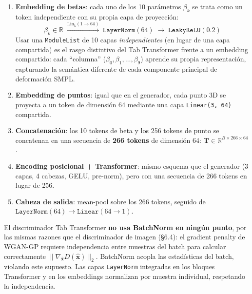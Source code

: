 \documentclass[a4paper,11pt]{article}
\begin{document}
\begin{enumerate}
    \item \textbf{Embedding de betas}: cada uno de los 10 parámetros
          $\beta_k$ se trata como un token independiente con su propia
          capa de proyección:
          \[
            \beta_k \in \mathbb{R}
            \;\xrightarrow{\text{Lin}_k(1 \to 64)}\;
            \texttt{LayerNorm}(64)
            \;\to\; \texttt{LeakyReLU}(0.2)
          \]
          Usar una \texttt{ModuleList} de 10 capas \emph{independientes}
          (en lugar de una capa compartida) es el rasgo distintivo del
          Tab Transformer frente a un embedding compartido: cada ``columna''
          ($\beta_0, \beta_1, \ldots, \beta_9$) aprende su propia
          representación, capturando la semántica diferente de cada
          componente principal de deformación SMPL.

    \item \textbf{Embedding de puntos}: igual que en el generador,
          cada punto 3D se proyecta a un token de dimensión 64 mediante
          una capa \texttt{Linear(3, 64)} compartida.

    \item \textbf{Concatenación}: los 10 tokens de beta y los 256 tokens
          de punto se concatenan en una secuencia de \textbf{266 tokens}
          de dimensión 64:
          $\bm{T} \in \mathbb{R}^{B \times 266 \times 64}$.

    \item \textbf{Encoding posicional + Transformer}: mismo esquema que el
          generador (3 capas, 4 cabezas, GELU, pre-norm), pero con una
          secuencia de 266 tokens en lugar de 256.

    \item \textbf{Cabeza de salida}: mean-pool sobre los 266 tokens,
          seguido de $\texttt{LayerNorm}(64) \to \texttt{Linear}(64 \to 1)$.
\end{enumerate}

\begin{tcolorbox}[colback=orange!5!white, colframe=orange!60!black,
                  title=Nota técnica: ausencia de BatchNorm]
El discriminador Tab Transformer \textbf{no usa BatchNorm en ningún punto},
por las mismas razones que el discriminador de imagen (§6.4): el gradient
penalty de WGAN-GP requiere independencia entre muestras del batch para
calcular correctamente $\|\nabla_{\hat{\bm{x}}} D(\hat{\bm{x}})\|_2$.
BatchNorm acopla las estadísticas del batch, violando este supuesto. Las
capas \texttt{LayerNorm} integradas en los bloques Transformer y en los
embeddings normalizan por muestra individual, respetando la independencia.
\end{tcolorbox}
\end{document}
